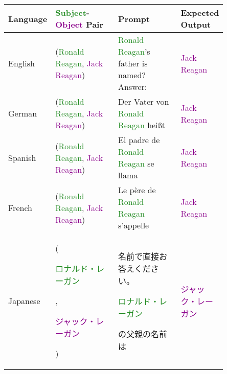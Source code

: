 \begin{table*}[htbp]
\scriptsize
\centering
\setlength{\tabcolsep}{1.0mm}{}
\begin{center}
\begin{tabular}{m{0.10\linewidth} p{0.30\linewidth} p{0.30\linewidth} m{0.15\linewidth}}
\textbf{Language} & \textbf{\textcolor{forestgreen}{Subject}-\textcolor{darkmagenta}{Object} Pair} & \textbf{Prompt} & \textbf{Expected Output} \\
\toprule
{\centering English} 
    & {\raggedright (\textcolor{forestgreen}{Ronald Reagan}, \textcolor{darkmagenta}{Jack Reagan})}
    & \textcolor{forestgreen}{Ronald Reagan}'s father is named? \newline Answer:
    & {\centering \textcolor{darkmagenta}{Jack Reagan}} \\
\midrule
{\centering German} 
    & {\raggedright (\textcolor{forestgreen}{Ronald Reagan}, \textcolor{darkmagenta}{Jack Reagan})}
    & Der Vater von \textcolor{forestgreen}{Ronald Reagan} heißt
    & {\centering \textcolor{darkmagenta}{Jack Reagan}} \\
\midrule
{\centering Spanish} 
    & {\raggedright (\textcolor{forestgreen}{Ronald Reagan}, \textcolor{darkmagenta}{Jack Reagan})}
    & El padre de \textcolor{forestgreen}{Ronald Reagan} se llama
    & {\centering \textcolor{darkmagenta}{Jack Reagan}} \\
\midrule
{\centering French} 
    & {\raggedright (\textcolor{forestgreen}{Ronald Reagan}, \textcolor{darkmagenta}{Jack Reagan})}
    & Le père de \textcolor{forestgreen}{Ronald Reagan} s'appelle
    & {\centering \textcolor{darkmagenta}{Jack Reagan}} \\
\midrule
{\centering Japanese} 
    & {\raggedright (\textcolor{forestgreen}{\begin{CJK}{UTF8}{min}ロナルド・レーガン\end{CJK}}, \textcolor{darkmagenta}{\begin{CJK}{UTF8}{min}ジャック・レーガン\end{CJK}})}
    & \begin{CJK}{UTF8}{min}名前で直接お答えください。\end{CJK}\textcolor{forestgreen}{\begin{CJK}{UTF8}{min}ロナルド・レーガン\end{CJK}}\begin{CJK}{UTF8}{min}の父親の名前は\end{CJK}
    & {\centering \textcolor{darkmagenta}{\begin{CJK}{UTF8}{min}ジャック・レーガン\end{CJK}}} \\

\end{tabular}
\end{center}
\end{table*}
